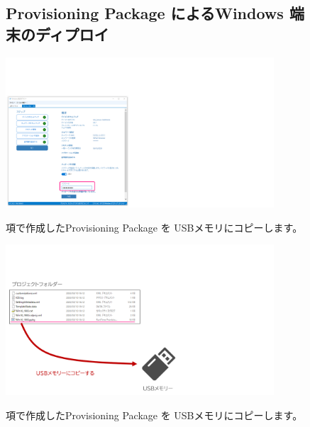 \begin{figure}[htbp]
    \subsection{Provisioning Package によるWindows 端末のディプロイ}
    \label{sec:ProvisioningPackageによるWindows端末のディプロイ}
\end{figure}

\begin{figure}[hp]
    \begin{minipage}{0.6\textwidth}
        \vspace{-1cm}
        \includegraphics[width=10cm]{figures/MakeProvisioningPackage-17}
    \end{minipage}
    \begin{minipage}{0.4\textwidth}
        \label{sec:ProvisioningPackageの作成}項で作成したProvisioning Package を USBメモリにコピーします。
    \end{minipage}
\end{figure}

\begin{figure}[hp]
    \begin{minipage}{0.6\textwidth}
        \vspace{-1cm}
        \includegraphics[width=10cm]{figures/Deploy-01.png}
    \end{minipage}
    \begin{minipage}{0.4\textwidth}
        \label{sec:ProvisioningPackageの作成}項で作成したProvisioning Package を USBメモリにコピーします。
    \end{minipage}
\end{figure}

